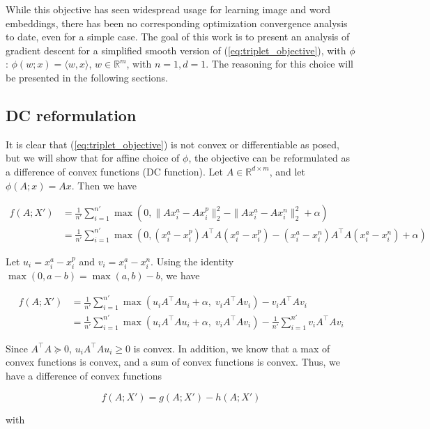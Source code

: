 \documentclass[11pt]{article}
\begin{document}
While this objective has seen widespread usage for learning image and word embeddings, there has been no corresponding optimization convergence analysis to date, even for a simple case. The goal of this work is to present an analysis of gradient descent for a simplified smooth version of (\ref{eq:triplet_objective}), with $\phi$: $\phi(w; x) = \langle w, x \rangle$, $w \in \mathbb{R}^{m}$, with $n=1, d=1$. The reasoning for this choice will be presented in the following sections.

\subsection{DC reformulation}

It is clear that (\ref{eq:triplet_objective}) is not convex or differentiable as posed, but we will show that for affine choice of $\phi$, the objective can be reformulated as a difference of convex functions (DC function). Let $A \in \mathbb{R}^{d \times m}$, and let $\phi(A; x) = Ax$. Then we have

\begin{align*}
    f(A; X') &= \frac{1}{n'} \sum_{i=1}^{n'} \max(0, \| Ax_i^a - Ax_i^p\|_2^2 - \| Ax_i^a - Ax_i^n \|_2^2 + \alpha) \\
    &= \frac{1}{n'} \sum_{i=1}^{n'} \max(0, (x_i^a - x_i^p)A^{\top}A(x_i^a - x_i^p) - (x_i^a - x_i^n)A^{\top}A(x_i^a - x_i^n) + \alpha) 
\end{align*}

Let $u_i = x_i^a - x_i^p$ and $v_i = x_i^a - x_i^n$. Using the identity $\max(0, a - b) = \max(a, b) - b$, we have

\begin{align*}
    f(A; X') &= \frac{1}{n'} \sum_{i=1}^{n'} \max(u_i A^{\top}Au_i + \alpha, \; v_i A^{\top}A v_i) - v_i A^{\top}A v_i \\
    &= \frac{1}{n'} \sum_{i=1}^{n'} \max(u_i A^{\top}Au_i + \alpha, \; v_i A^{\top}A v_i) - \frac{1}{n'} \sum_{i=1}^{n'} v_i A^{\top}A v_i
\end{align*}

Since $A^{\top}A \succeq 0$, \; $u_i A^{\top}Au_i \geq 0$ is convex. In addition, we know that a max of convex functions is convex, and a sum of convex functions is convex. Thus, we have a difference of convex functions

\begin{equation}
    f(A; X') = g(A; X') - h(A; X')
\end{equation}

with
\end{document}
